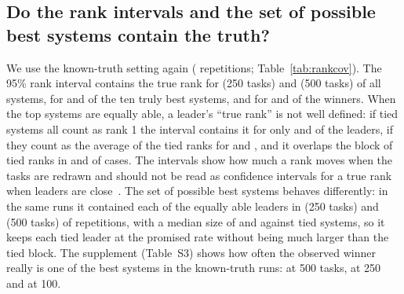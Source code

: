 \documentclass[11pt]{article}
\begin{document}
\subsection{Do the rank intervals and the set of possible best systems contain the truth?}
We use the known-truth setting again (\NumRankCovR{} repetitions; Table~\ref{tab:rankcov}).
The 95\% rank interval contains the true rank for \NumRankCovAllA{} (250 tasks) and \NumRankCovAllB{} (500 tasks) of all systems, for \NumRankCovTopA{} and \NumRankCovTopB{} of the ten truly best systems, and for \NumRankCovWinA{} and \NumRankCovWinB{} of the winners.
When the top \NumBunchEqualTop{} systems are equally able, a leader's ``true rank'' is not well defined: if tied systems all count as rank 1 the interval contains it for only \NumRankBunchLeadA{} and \NumRankBunchLeadB{} of the leaders, if they count as the average of the tied ranks for \NumRankBunchLeadAvgA{} and \NumRankBunchLeadAvgB{}, and it overlaps the block of tied ranks in \NumRankBunchBlockA{} and \NumRankBunchBlockB{} of cases.
The intervals show how much a rank moves when the tasks are redrawn and should not be read as confidence intervals for a true rank when leaders are close~\citep{neuhof2026rankintervals,mogstad2024ranks}.
The set of possible best systems behaves differently: in the same runs it contained each of the equally able leaders in \NumSetBunchInA{} (250 tasks) and \NumSetBunchInB{} (500 tasks) of repetitions, with a median size of \NumSetBunchSizeA{} and \NumSetBunchSizeB{} against \NumBunchEqualTop{} tied systems, so it keeps each tied leader at the promised rate without being much larger than the tied block.
The supplement (Table~S3) shows how often the observed winner really is one of the best systems in the known-truth runs: \NumVFourNCWin{} at 500 tasks, \NumVFourNBWin{} at 250 and \NumVFourNAWin{} at 100.

\begin{table}[t]
\centering\scriptsize
\resizebox{\textwidth}{!}{}
\caption{How often the 95\% rank intervals and the set of possible best systems contain the truth, SWE-bench Verified, known-truth simulation. Equal leaders: the \NumBunchEqualTop{} top systems have equal true ability; the three conventions treat their true rank as 1, as the average of the tied ranks, or as the whole tied block.}
\label{tab:rankcov}
\end{table}
\end{document}
